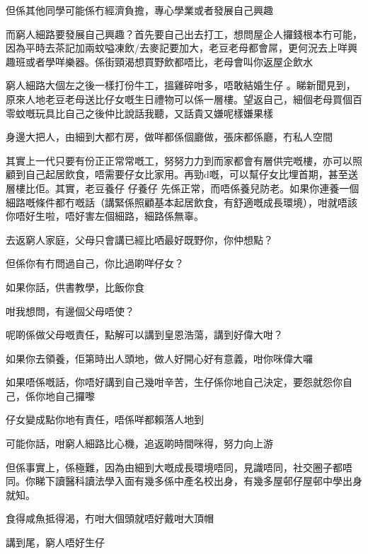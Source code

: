 但係其他同學可能係冇經濟負擔，專心學業或者發展自己興趣

而窮人細路要發展自己興趣？首先要自己出去打工，想問屋企人攞錢根本冇可能，因為平時去茶記加兩蚊嗌凍飲/去麥記要加大，老豆老母都會屌，更何況去上咩興趣班或者學咩樂器。係街頸渴想買野飲都唔比，老母會叫你返屋企飲水

窮人細路大個左之後一樣打份牛工，搵雞碎咁多，唔敢結婚生仔 。睇新聞見到，原來人地老豆老母送比仔女嘅生日禮物可以係一層樓。望返自己，細個老母買個百零蚊嘅玩具比自己之後仲比說話我聽，又話貴又嫌呢樣嫌果樣

身邊大把人，由細到大都冇房，做咩都係個廳做，張床都係廳，冇私人空間

其實上一代只要有份正正常常嘅工，努努力力到而家都會有層供完嘅樓，亦可以照顧到自己起居飲食，唔需要仔女比家用。再勁d嘅，可以幫仔女比埋首期，甚至送層樓比佢。其實，老豆養仔 仔養仔 先係正常，而唔係養兒防老。如果你連養一個細路嘅條件都冇嘅話（講緊係照顧基本起居飲食，有舒適嘅成長環境），咁就唔該你唔好生啦，唔好害左個細路，細路係無辜。

去返窮人家庭，父母只會講已經比哂最好既野你，你仲想點？

但係你有冇問過自己，你比過啲咩仔女？

如果你話，供書教學，比飯你食

咁我想問，有邊個父母唔使？

呢啲係做父母嘅責任，點解可以講到皇恩浩蕩，講到好偉大咁？

如果你去領養，佢第時出人頭地，做人好開心好有意義，咁你咪偉大囉

如果唔係嘅話，你唔好講到自己幾咁辛苦，生仔係你地自己決定，要怨就怨你自己，係你地自己攞嚟

仔女變成點你地有責任，唔係咩都賴落人地到

可能你話，咁窮人細路比心機，追返啲時間咪得，努力向上游

但係事實上，係極難，因為由細到大嘅成長環境唔同，見識唔同，社交圈子都唔同。你睇下讀醫科讀法學入面有幾多係中產名校出身，有幾多屋邨仔屋邨中學出身就知。

食得咸魚抵得渴，冇咁大個頭就唔好戴咁大頂帽

講到尾，窮人唔好生仔

